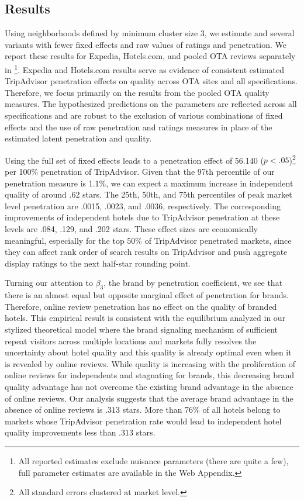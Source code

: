 \documentclass{informs_mod} %
\begin{document}
\subsection{Results}

Using neighborhoods defined by minimum cluster size 3, we estimate  and several variants with fewer fixed effects and raw values of ratings and penetration. We report these results for Expedia, Hotels.com, and pooled OTA reviews separately in \footnote{All reported estimates exclude nuisance parameters (there are quite a few), full parameter estimates are available in the Web Appendix.}. Expedia and Hotels.com results serve as evidence of consistent estimated TripAdvisor penetration effects on quality across OTA sites and all specifications. Therefore, we focus primarily on the results from the pooled OTA quality measures. The hypothesized predictions on the parameters are reflected across all specifications and are robust to the exclusion of various combinations of fixed effects and the use of raw penetration and ratings measures in place of the estimated latent penetration and quality. 

Using the full set of fixed effects leads to a penetration effect of 56.140 ($p<.05$)\footnote{All standard errors clustered at market level.} per 100\% penetration of TripAdvisor. Given that the 97th percentile of our penetration measure is 1.1\%, we can expect a maximum increase in independent quality of around .62 stars. The 25th, 50th, and 75th percentiles of peak market level penetration are .0015, .0023, and .0036, respectively. The corresponding improvements of independent hotels due to TripAdvisor penetration at these levels are .084, .129, and .202 stars. These effect sizes are economically meaningful, especially for the top 50\% of TripAdvisor penetrated markets, since they can affect rank order of search results on TripAdvisor and push aggregate display ratings to the next half-star rounding point.

Turning our attention to $\beta_3$, the brand by penetration coefficient, we see that there is an almost equal but opposite marginal effect of penetration for brands. Therefore, online review penetration has no effect on the quality of branded hotels. This empirical result is consistent with the equilibrium analyzed in our stylized theoretical model where the brand signaling mechanism of sufficient repeat visitors across multiple locations and markets fully resolves the uncertainty about hotel quality and this quality is already optimal even when it is revealed by online reviews. While quality is increasing with the proliferation of online reviews for independents and stagnating for brands, this decreasing brand quality advantage has not overcome the existing brand advantage in the absence of online reviews. Our analysis suggests that the average brand advantage in the absence of online reviews is $.313$ stars. More than 76\% of all hotels belong to markets whose TripAdvisor penetration rate would lead to independent hotel quality improvements less than $.313$ stars. 
\end{document}
